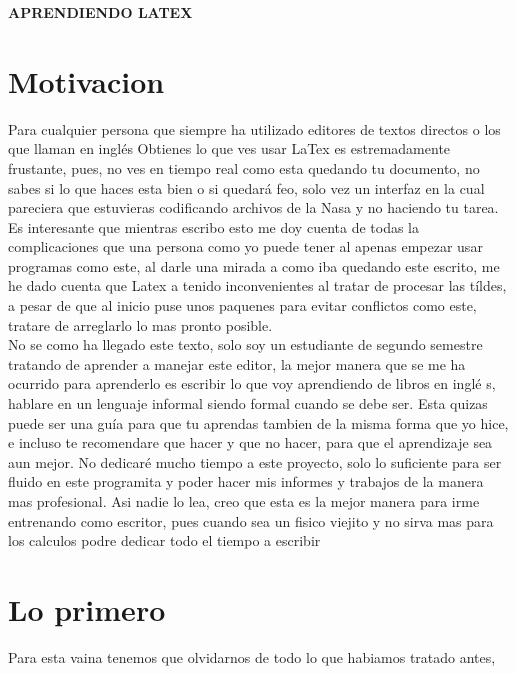 \documentclass{article}
\begin{document}
\begin{center}
\textbf{APRENDIENDO LATEX}
\end{center}
\begin{flushleft}
\part{Motivacion}
Para cualquier persona que siempre ha utilizado editores de textos directos o los que llaman en inglés Obtienes lo que ves usar LaTex es estremadamente frustante, pues, no ves en tiempo real como esta quedando tu documento, no sabes si lo que haces esta bien o si quedará feo, solo vez un interfaz en la cual pareciera que estuvieras codificando archivos de la Nasa y no haciendo tu tarea. Es interesante que mientras escribo esto me doy cuenta de todas la complicaciones que una persona como yo puede tener al apenas empezar usar programas como este, al darle una mirada a como iba quedando este escrito, me he dado cuenta que Latex a tenido inconvenientes al tratar de procesar las tíldes, a pesar de que al inicio puse unos paquenes para evitar conflictos como este, tratare de arreglarlo lo mas pronto posible. 
\\
No se como ha llegado este texto, solo soy un estudiante de segundo semestre tratando de aprender a manejar este editor, la mejor manera que se me ha ocurrido para aprenderlo es escribir lo que voy aprendiendo de libros en ingl\'e s, hablare en un lenguaje informal siendo formal cuando se debe ser. Esta quizas puede ser una guía para que tu aprendas tambien de la misma forma que yo hice, e incluso te recomendare que hacer y que no hacer, para que el aprendizaje sea aun mejor. No dedicaré mucho tiempo a este proyecto, solo lo suficiente para ser fluido en este programita y poder hacer mis informes y trabajos de la manera mas profesional. Asi nadie lo lea, creo que esta es la mejor manera para irme entrenando como escritor, pues cuando sea un fisico viejito y no sirva mas para los calculos podre dedicar todo el tiempo a escribir
\part{Lo primero}
Para esta vaina tenemos que olvidarnos de todo lo que habiamos tratado antes, 
\end{flushleft}
\end{document}
